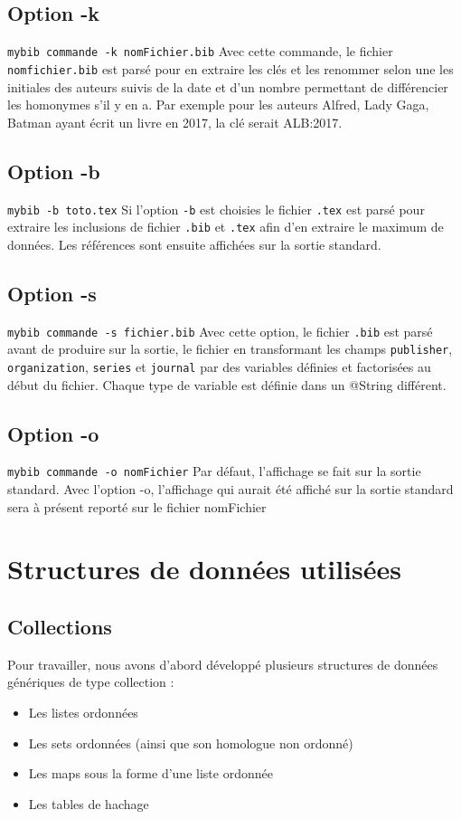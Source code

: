 \documentclass[hidelinks, a4paper,11pt,twoside,final]{article}
\begin{document}
\subsection{Option -k}
\texttt{mybib commande -k nomFichier.bib}
\newline
Avec cette commande, le fichier \texttt{nomfichier.bib} est parsé pour en extraire les clés et les renommer selon une les initiales des auteurs suivis 
de la date et d'un nombre permettant de différencier les homonymes s'il y en a.
Par exemple pour les auteurs Alfred, Lady Gaga, Batman ayant écrit un livre en 2017, la clé serait ALB:2017.

\subsection{Option -b}
\texttt{mybib -b toto.tex}
\newline
Si l'option \texttt{-b} est choisies le fichier \texttt{.tex} est parsé pour extraire les inclusions de fichier \texttt{.bib} et \texttt{.tex}
afin d'en extraire le maximum de données. 
Les références sont ensuite affichées sur la sortie standard.

\subsection{Option -s}
\texttt{mybib commande -s fichier.bib}
\newline
Avec cette option, le fichier \texttt{.bib} est parsé avant de produire sur la sortie,
le fichier en transformant les champs \texttt{publisher}, \texttt{organization}, \texttt{series} et  \texttt{journal}
par des variables définies et factorisées au début du fichier. 
Chaque type de variable est définie dans un @String différent.

\subsection{Option -o}
\texttt{mybib commande -o nomFichier}
\newline
Par défaut, l'affichage se fait sur la sortie standard. 
Avec l'option -o, l'affichage qui aurait été affiché sur la sortie standard sera à présent reporté sur le fichier nomFichier


\section{Structures de données utilisées}
\subsection{Collections}
Pour travailler, nous avons d'abord développé plusieurs structures de données génériques de type collection :
\begin{itemize}
 \item Les listes ordonnées 
 \item Les sets ordonnées (ainsi que son homologue non ordonné)
 \item Les maps sous la forme d'une liste ordonnée 
 \item Les tables de hachage
\end{itemize}
\end{document}
